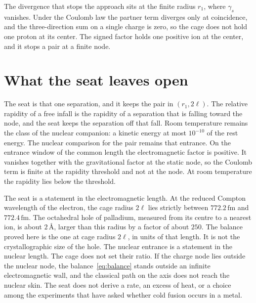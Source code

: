 \documentclass[a4paper]{article}
\begin{document}
The divergence that stops the approach sits at the finite radius \(r_1\), where \(\gamma_s\) vanishes. Under the Coulomb law the partner term diverges only at coincidence, and the three-direction sum on a single charge is zero, so the cage does not hold one proton at its center. The signed factor holds one positive ion at the center, and it stops a pair at a finite node.

\section{What the seat leaves open}
\label{sec:open}

The seat is that one separation, and it keeps the pair in \((r_1,2\ell)\). The relative rapidity of a free infall is the rapidity of a separation that is falling toward the node, and the seat keeps the separation off that fall. Room temperature remains the class of the nuclear companion: a kinetic energy at most \(10^{-10}\) of the rest energy. The nuclear comparison for the pair remains that entrance. On the entrance window of the common length the electromagnetic factor is positive. It vanishes together with the gravitational factor at the static node, so the Coulomb term is finite at the rapidity threshold and not at the node. At room temperature the rapidity lies below the threshold.

The seat is a statement in the electromagnetic length. At the reduced Compton wavelength of the electron, the cage radius \(2\ell\) lies strictly between \(772.2\,\mathrm{fm}\) and \(772.4\,\mathrm{fm}\). The octahedral hole of palladium, measured from its centre to a nearest ion, is about \(2\,\text{\AA}\), larger than this radius by a factor of about \(250\). The balance proved here is the one at cage radius \(2\ell\), in units of that length. It is not the crystallographic size of the hole. The nuclear entrance is a statement in the nuclear length. The cage does not set their ratio. If the charge node lies outside the nuclear node, the balance~\eqref{eq:balance} stands outside an infinite electromagnetic wall, and the classical path on the axis does not reach the nuclear skin. The seat does not derive a rate, an excess of heat, or a choice among the experiments that have asked whether cold fusion occurs in a metal.
\end{document}
